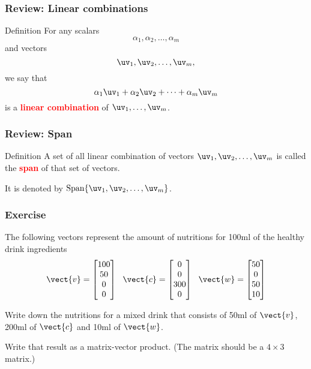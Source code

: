 

\begin{frame}
  \frametitle{Review: Linear combinations}

  \begin{block}{Definition}
    For any scalars
    \[
    \alpha_1,\alpha_2,\ldots,\alpha_m
    \]
    and vectors
    \[
    \uv_1,\uv_2,\ldots,\uv_m,
    \]
    we say that
    \[
    \alpha_1\uv_1 + \alpha_2\uv_2 + \cdots + \alpha_m \uv_m
    \]
    is a \textcolor{red}{\bf linear combination} of $\uv_1,\ldots,\uv_m$.
  \end{block}
\end{frame}

\begin{frame}
  \frametitle{Review: Span}

  \begin{block}{Definition}
    A set of all linear combination of vectors $\uv_1,\uv_2,\ldots,\uv_m$ is called the \textcolor{red}{\bf span} of that set of vectors.

    It is denoted by $\mathrm{Span} \{\uv_1,\uv_2,\ldots,\uv_m\}$.
  \end{block}
\end{frame}

\begin{frame}
  \frametitle{Exercise}

  The following vectors represent the amount of nutritions for 100ml
  of the healthy drink ingredients
  \[
  \vect{v}=\begin{bmatrix}
  100 \\ 50 \\ 0 \\ 0
  \end{bmatrix} \ \ 
  \vect{c}=\begin{bmatrix}
  0 \\ 0 \\ 300 \\ 0
  \end{bmatrix} \ \
  \vect{w}=\begin{bmatrix}
  50 \\ 0 \\ 50 \\ 10
  \end{bmatrix} 
  \]

  \pause Write down the nutritions for a mixed drink that consists of
  50ml of $\vect{v}$, 200ml of $\vect{c}$ and 10ml of $\vect{w}$.

  \pause

  Write that result as a matrix-vector product.  (The matrix should be
  a $4\times 3$ matrix.)
\end{frame}

